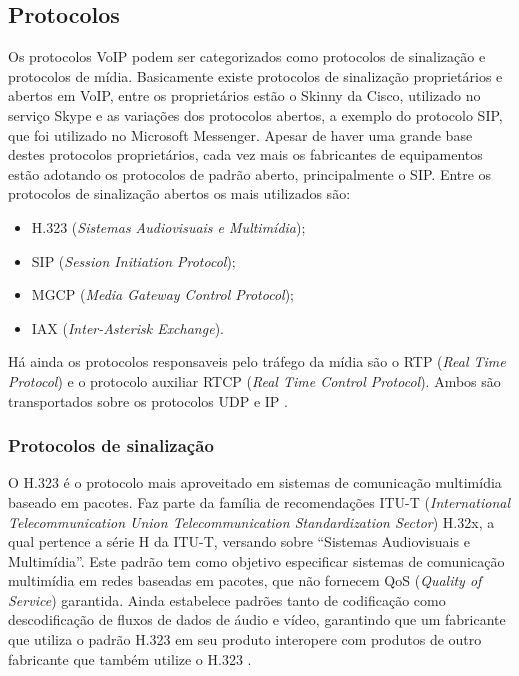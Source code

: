\subsection{Protocolos}

Os protocolos VoIP podem ser categorizados como protocolos de sinalização e  protocolos de mídia. Basicamente existe protocolos de sinalização proprietários e abertos em VoIP, entre os proprietários estão o Skinny da Cisco, utilizado no serviço Skype e as variações dos protocolos abertos, a exemplo do protocolo SIP, que foi utilizado no Microsoft Messenger. Apesar de haver uma grande base destes protocolos proprietários, cada vez mais os fabricantes de equipamentos estão adotando os protocolos de padrão aberto, principalmente o SIP. Entre os protocolos de sinalização abertos os mais utilizados são: \cite{davidson2008}
\begin{itemize}
  \item H.323 (\textit{Sistemas Audiovisuais e Multimídia});
  \item SIP (\textit{Session Initiation Protocol});
  \item MGCP (\textit{Media Gateway Control Protocol});
  \item IAX (\textit{Inter-Asterisk Exchange}).
\end{itemize}

Há ainda os protocolos responsaveis pelo tráfego da mídia são o RTP (\textit{Real Time Protocol}) e o protocolo auxiliar RTCP (\textit{Real Time Control Protocol}). Ambos são transportados sobre os protocolos UDP e IP \cite{davidson2008}.

\subsubsection{Protocolos de sinalização}

O H.323 é o protocolo mais aproveitado em sistemas de comunicação multimídia baseado em pacotes. Faz parte da família de recomendações ITU-T (\textit{International Telecommunication Union Telecommunication Standardization Sector}) H.32x, a qual pertence a série H da ITU-T, versando sobre “Sistemas Audiovisuais e Multimídia”. Este padrão tem como objetivo especificar sistemas de comunicação multimídia em redes baseadas em pacotes, que não fornecem QoS (\textit{Quality of Service}) garantida. Ainda estabelece padrões tanto de codificação como descodificação de fluxos de dados de áudio e vídeo, garantindo que um fabricante que utiliza o padrão H.323 em seu produto interopere com produtos de outro fabricante que também utilize o H.323 \cite{thiagowinkler2007}.

